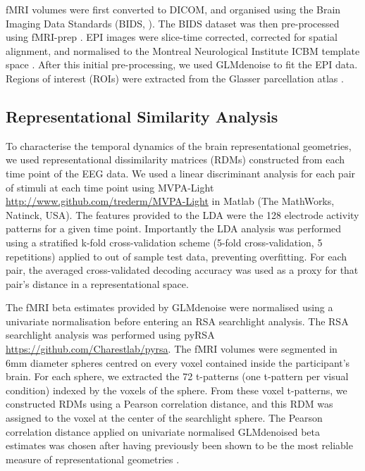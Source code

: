 \documentclass[10pt,letterpaper]{article}
\begin{document}
fMRI volumes were first converted to DICOM, and organised using the 
Brain Imaging Data Standards (BIDS, \cite{Gorgolewski2016-ot}). The 
BIDS dataset was then pre-processed using fMRI-prep \cite{Esteban2019-od}. 
EPI images were slice-time corrected, corrected for spatial alignment, 
and normalised to the Montreal Neurological Institute ICBM template 
space \cite{Mazziotta2001-lt}. After this initial pre-processing, we 
used GLMdenoise \cite{Kay2013-in,Charest2018-mk} to fit the 
EPI data. Regions of interest (ROIs) were extracted from
the Glasser parcellation atlas \cite{Glasser2016-xv}. 

\subsection{Representational Similarity Analysis}

To characterise the temporal dynamics of the brain representational 
geometries, we used representational dissimilarity matrices (RDMs) 
constructed from each time point of the EEG data. We used a linear 
discriminant analysis for each pair of stimuli at each time point 
using MVPA-Light \url{http://www.github.com/trederm/MVPA-Light} in 
Matlab (The MathWorks, Natinck, USA). The features provided to 
the LDA were the 128 electrode activity patterns for a given time 
point. Importantly the LDA analysis was performed using a stratified 
k-fold cross-validation scheme (5-fold cross-validation, 5 repetitions) 
applied to out of sample test data, preventing overfitting. For 
each pair, the averaged cross-validated decoding accuracy was used 
as a proxy for that pair’s distance in a representational space.

The fMRI beta estimates provided by GLMdenoise were normalised 
using a univariate normalisation \cite{Misaki2010-mb} before 
entering an RSA searchlight analysis. The RSA searchlight analysis 
was performed using pyRSA \url{https://github.com/Charestlab/pyrsa}.
The fMRI volumes were segmented in 6mm diameter spheres centred 
on every voxel contained inside the participant’s brain. For each 
sphere, we extracted the 72 t-patterns (one t-pattern per visual 
condition) indexed by the voxels of the sphere. From these voxel 
t-patterns, we constructed RDMs using a Pearson correlation distance, 
and this RDM was assigned to the voxel at the center of the 
searchlight sphere. The Pearson correlation distance applied on 
univariate normalised GLMdenoised beta estimates was chosen after 
having previously been shown to be the most reliable measure of 
representational geometries \cite{Charest2018-mk}. 
\end{document}
